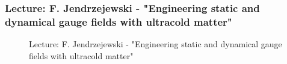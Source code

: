 \documentclass[11pt,a4paper]{article}
\numberwithin{equation}{section}
\numberwithin{table}{section}\setlength{\multlinegap}{25pt}
\begin{document}
\subsubsection{Lecture: F. Jendrzejewski - "Engineering static and dynamical gauge fields with ultracold matter"}

\begin{figure}[H]
\centering
\null\hfill %
\hfill %
\hfill %
\hfill %
\hfill\null %
\caption{Lecture: F. Jendrzejewski - "Engineering static and dynamical gauge fields with ultracold matter"}
\end{figure}
\end{document}
